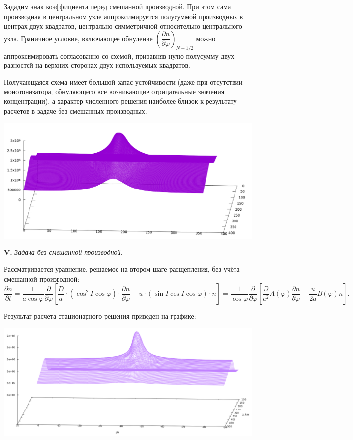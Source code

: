 \documentclass[2pt, a4paper, fleqn]{extarticle}
\begin{document}
\begin{itemize}
Зададим знак коэффициента перед смешанной производной. При этом сама производная в центральном узле аппроксимируется полусуммой производных в центрах двух квадратов, центрально симметричной относительно центрального узла. Граничное условие, включающее обнуление $\left(\dfrac{\partial n}{\partial\varphi}\right)_{N+1/2}$ можно аппроксимировать согласованно со схемой, приравняв нулю полусумму двух разностей на верхних сторонах двух используемых квадратов.

Получающаяся схема имеет большой запас устойчивости (даже при отсутствии  монотонизатора, обнуляющего все возникающие отрицательные значения концентрации), а характер численного решения наиболее близок к результату расчетов в задаче без смешанных производных.

\includegraphics[scale=0.3]{scheme3.png}

\end{itemize}

{\bf V.} \textit{Задача без смешанной производной.}

Рассматривается уравнение, решаемое на втором шаге расщепления, без учёта смешанной производной: $$\dfrac{\partial n}{\partial t} = \dfrac{1}{a\cos\varphi} \dfrac{\partial }{\partial \varphi}\left[\dfrac{D}{a}\cdot(\cos^2  I \cos\varphi)\cdot\dfrac{\partial n}{\partial \varphi} - u\cdot(\sin I \cos I \cos\varphi)\cdot n \right] =  \dfrac{1}{\cos\varphi} \dfrac{\partial }{\partial \varphi}\left[\dfrac{D}{a^2}A(\varphi)\dfrac{\partial n}{\partial \varphi} - \dfrac{u}{2a}B(\varphi) n \right].$$

Результат расчета стационарного решения приведен на графике:

\includegraphics[scale=0.5]{linear_2st_order}
\end{document}
